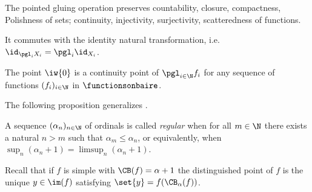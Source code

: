 
\begin{fact}\label{BasicsOnPointedGluing}
The pointed gluing operation preserves countability, closure, compactness, Polishness of sets; continuity, injectivity, surjectivity, scatteredness of functions.

It commutes with the identity natural transformation, i.e. $\id_{\pgl_{i}X_i}=\pgl_{i}\id_{X_i}$.

The point $\iw{0}$ is a continuity point of $\pgl_{i\in\N} f_i$ for any sequence of functions $(f_i)_{i\in\N}$ in $\functionsonbaire$.
\end{fact}

The following proposition generalizes \cite[Proposition 3.1]{carroy2013quasi}.

A sequence $(\alpha_n)_{n\in\N}$ of ordinals is called \emph{regular} when for all $m\in\N$ there exists a natural $n>m$ such that $\alpha_m\leq\alpha_n$, or
equivalently, when $\sup_n(\alpha_n+1)=\limsup_n(\alpha_n+1)$.

Recall that if $f$ is simple with $\CB(f)=\alpha+1$ the distinguished point of $f$ is the unique $y\in\im(f)$ satisfying $\set{y}=f(\CB_{\alpha}(f))$.



